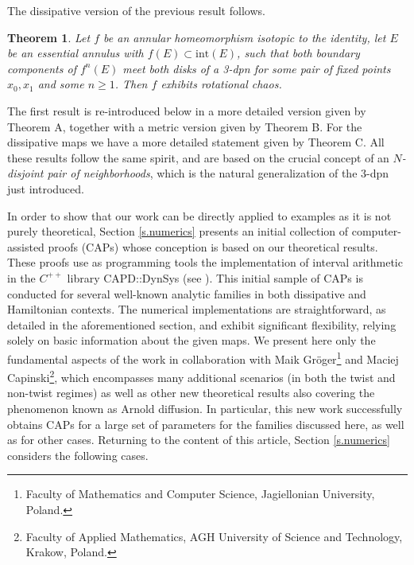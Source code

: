\documentclass[12pt,a4paper]{amsart}
\newtheorem*{thm*}{Theorem}
\theoremstyle{definition}
\theoremstyle{remark}
\begin{document}
The dissipative version of the previous result follows.

\begin{thm*}

Let $f$ be an annular homeomorphism isotopic to the identity, let $E$ be an essential annulus with $f(E)\subset\mathrm{int}(E)$, such that both boundary components of $f^n(E)$ meet
both disks of a 3-dpn for some pair of fixed points $x_0,x_1$ and some $n\geq 1$. Then $f$ exhibits rotational chaos.

\end{thm*}

The first result is re-introduced below in a more detailed version given by Theorem A, together with a metric version given by Theorem B. For the dissipative maps we have a more detailed statement given by Theorem C. All these results follow the same spirit, and are based on the crucial concept of an \( N \)\emph{-disjoint pair of neighborhoods}, which is the natural generalization of the $3$-dpn just introduced. 


In order to show that  our work can be directly applied to examples as it is not purely theoretical,
Section \ref{s.numerics} presents an initial collection of computer-assisted proofs (CAPs) whose conception is based on our theoretical results. These proofs use as programming tools the implementation of interval arithmetic in the $C^{++}$ library CAPD::DynSys (see \cite{compassproof}). This initial sample of CAPs is conducted for several well-known analytic families in both dissipative and Hamiltonian contexts. The numerical implementations are straightforward, as detailed in the aforementioned section, and exhibit significant flexibility, relying solely on basic information about the given maps. We present here only the fundamental aspects of the work \cite{theoappandnumer} in collaboration with Maik Gröger\footnote{Faculty of Mathematics and Computer Science, Jagiellonian University, Poland.} and Maciej Capinski\footnote{Faculty of Applied Mathematics, AGH University of Science and Technology, Krakow, Poland.}, which encompasses many additional scenarios (in both the twist and non-twist regimes) as well as other new theoretical results also covering the phenomenon known as Arnold diffusion. In particular, this new work successfully obtains CAPs for a large set of parameters for the families discussed here, as well as for other cases. Returning to the content of this article, Section \ref{s.numerics} considers the following cases.

\smallskip
\end{document}
